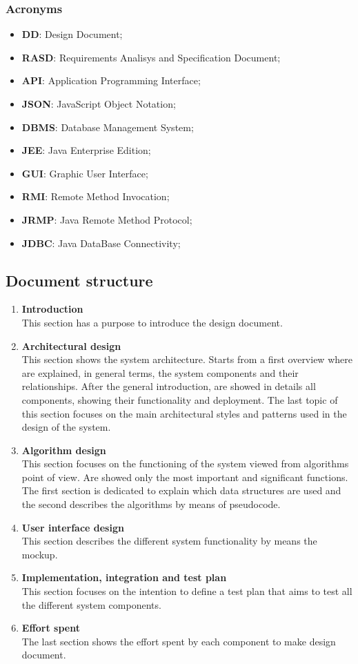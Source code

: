\subsubsection{Acronyms}
\begin{itemize}
	\item \textbf{DD}: Design Document;
	\item \textbf{RASD}: Requirements Analisys and Specification Document;
	\item \textbf{API}: Application Programming Interface;
	\item \textbf{JSON}: JavaScript Object Notation;
	\item \textbf{DBMS}: Database Management System;
	\item \textbf{JEE}: Java Enterprise Edition;
	\item \textbf{GUI}: Graphic User Interface;
	\item \textbf{RMI}: Remote Method Invocation;
	\item \textbf{JRMP}: Java Remote Method Protocol;
	\item \textbf{JDBC}: Java DataBase Connectivity;
\end{itemize}

\subsection{Document structure}
\begin{enumerate}
	\item \textbf{Introduction}\\
		This section has a purpose to introduce the design document. 
	\item \textbf{Architectural design}\\
		This section shows the system architecture. Starts from a first overview where are explained, in general terms, the system components and their relationships.
		After the general introduction, are showed in details all components, showing their functionality and deployment.
		The last topic of this section focuses on the main architectural styles and patterns used in the design of the system. 
	\item \textbf{Algorithm design}\\
		This section focuses on the functioning of the system viewed from algorithms point of view. Are showed only the most important and significant functions.
		The first section is dedicated to explain which data structures are used and the second describes the algorithms by means of pseudocode.
	\item \textbf{User interface design}\\
		This section describes the different system functionality by means the mockup.  
	\item \textbf{Implementation, integration and test plan}\\
		This section focuses on the intention to define a test plan that aims to test all the different system components.
	\item \textbf{Effort spent}\\
		The last section shows the effort spent by each component to make design document.
\end{enumerate}